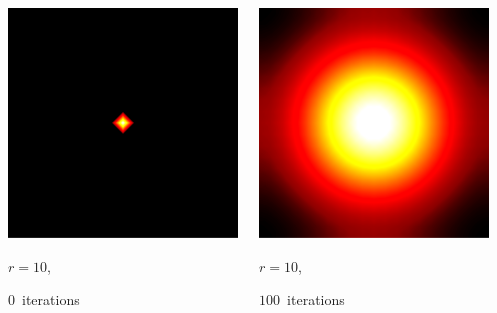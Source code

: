 \documentclass[aspectratio=169,t]{beamer}
\begin{document}
{\begin{columns}
\begin{column}{0.22\textwidth}
			\includegraphics[width=.85\textwidth]{data/synthetic_meshes/square_tesselation_4tri_Dirac_delta_10_v841_f1600_funcvals_0iter.png}
			{\footnotesize
				\par \vspace{-1mm} $r=10$,
				\par \vspace{-1mm} $0$~iterations
			}
		\end{column}
		\begin{column}{0.22\textwidth}
			\centering
			\includegraphics[width=.85\textwidth]{data/synthetic_meshes/square_tesselation_4tri_Dirac_delta_10_v841_f1600_funcvals_100iter.png}
			{\footnotesize
				\par \vspace{-1mm} $r=10$,
				\par \vspace{-1mm} $100$~iterations
			}
		\end{column}
		\begin{column}{0.17\textwidth}~\end{column}
	\end{columns}
}
\end{document}

